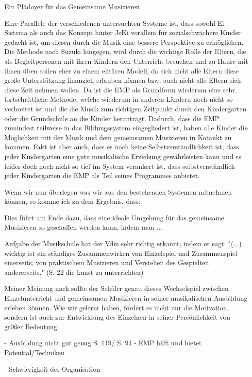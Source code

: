 Ein Plädoyer für das Gemeinsame Musizieren

Eine Parallele der verschiedenen untersuchten Systeme ist, dass sowohl El Sistema als auch das Konzept hinter JeKi vorallem
für sozialschwächere Kinder gedacht ist, um diesen durch die Musik eine bessere
Perspektive zu ermöglichen. Die Methode nach Suzuki hingegen, wird durch die
wichtige Rolle der Eltern, die als Begleitpersonen mit ihren Kindern den
Unterricht besuchen und zu Hause mit ihnen üben sollen eher zu einem elitären
Modell, da sich nicht alle Eltern diese große Unterstützung finanziell erlauben
können bzw. auch nicht alle Eltern sich diese Zeit nehmen wollen. 
Da ist die EMP als Grundform wiederum eine sehr fortschrittliche Methode, welche
wiederum in anderen Ländern noch nicht so verbreitet ist und die die Musik zum
richtigen Zeitpunkt durch den Kindergarten oder die Grundschule an die Kinder
heranträgt. Dadurch, dass die EMP zumindest teilweise in das Bildungssystem eingegliedert ist, haben
alle Kinder die Möglichkeit mit der Musik und dem gemeinsamen Musizieren in
Kotankt zu kommen. Fakt ist aber auch, dass es noch keine Selbstverständlichkeit
ist, dass jeder Kindergarten eine gute musikalische Erziehung gewährleisten kann
und es leider doch noch nicht so tief im System verankert ist, dass
selbstverständlich jeder Kindergarten die EMP als Teil seines Programmes
anbietet.  

Wenn wir nun überlegen was wir aus den bestehenden Systemen mitnehmen können, so
komme ich zu dem Ergebnis, dass: 

Dies führt am Ende dazu, dass eine ideale Umgebung für das gemeinsame Musizieren
so geschaffen werden kann, indem man ...

Aufgabe der Musikschule hat der Vdm sehr richtig erkannt, indem er sagt: "(...)
wichtig ist ein ständiges Zusammenwirken von Einzelspiel und Zusammenspiel
einerseits, von praktischem Musizieren und Verstehen des Gespielten
andererseits." (S. 22 die kunst zu unterrichten)

Meiner Meinung nach sollte der Schüler genau dieses Wechselspiel zwischen
Einzelunterricht und gemeinsamen Musizieren in seiner musikalischen Ausbildung
erleben können. Wie wir gelernt haben, fördert es nicht nur die Motivation,
sondern ist auch zur Entwicklung des Einzelnen in seiner Persönlichkeit von
gr0ßer Bedeutung. 


- Ausbildung nicht gut genug S. 119/ S. 94
- EMP hilft und bietet Potential/Techniken

- Schwierigkeit der Organisation

